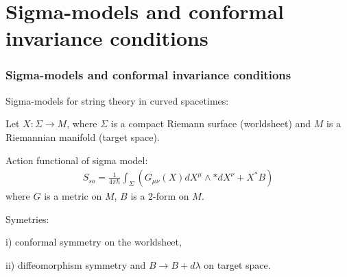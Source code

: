 \documentclass[9pt]{beamer}
\begin{document}

\section[Sigma-models and conformal invariance conditions]{Sigma-models and conformal invariance conditions}
\begin{frame}
\frametitle{Sigma-models and conformal invariance conditions}
Sigma-models for string theory in curved spacetimes: \\

\vspace*{3mm}

Let $X: \Sigma\to M$, where $\Sigma$ is a compact Riemann surface (worldsheet) and  $M$ is a Riemannian manifold (target space).\\

\vspace{3mm}

Action functional of sigma model:
\begin{eqnarray*}
S_{so}=\frac{1}{4\pi h}\int_{\Sigma}(G_{\mu\nu}(X)dX^\mu\wedge *dX^{\nu}+X^*B)
\end{eqnarray*}
where $G$ is a metric on $M$, $B$ is a 2-form on $M$.\\

\vspace*{3mm}

Symetries: \\

\vspace*{1mm}

i) conformal symmetry on the worldsheet, \\  

\vspace*{1mm}

ii) diffeomorphism symmetry and $B\to B+d\lambda$ on target space. \\

\end{frame}
\end{document}
